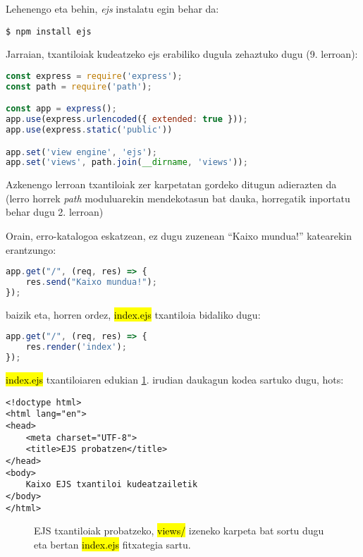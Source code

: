 Lehenengo eta behin, \textit{ejs} instalatu egin behar da:

\begin{lstlisting}[numbers=none]
$ npm install ejs 
\end{lstlisting}

Jarraian, txantiloiak kudeatzeko ejs erabiliko dugula zehaztuko dugu (9. lerroan):

\begin{lstlisting}[language=JavaScript,numbers=none]
const express = require('express');
const path = require('path');

const app = express();
app.use(express.urlencoded({ extended: true }));
app.use(express.static('public'))

app.set('view engine', 'ejs');
app.set('views', path.join(__dirname, 'views'));
\end{lstlisting}

Azkenengo lerroan txantiloiak zer karpetatan gordeko ditugun adierazten da (lerro horrek \textit{path} moduluarekin mendekotasun bat dauka, horregatik inportatu behar dugu 2. lerroan)

Orain, erro-katalogoa eskatzean, ez dugu zuzenean ``Kaixo mundua!'' katearekin erantzungo:

\begin{lstlisting}[language=JavaScript, numbers=none]
app.get("/", (req, res) => {
    res.send("Kaixo mundua!");
});
\end{lstlisting}

baizik eta, horren ordez, \hl{index.ejs} txantiloia bidaliko dugu:

\begin{lstlisting}[language=JavaScript, numbers=none]
app.get("/", (req, res) => {
    res.render('index');
});
\end{lstlisting}

\hl{index.ejs} txantiloiaren edukian \ref{fig:ejs}. irudian daukagun kodea sartuko dugu, hots:

\begin{lstlisting}[numbers=none]
<!doctype html>
<html lang="en">
<head>
    <meta charset="UTF-8">
    <title>EJS probatzen</title>
</head>
<body>
    Kaixo EJS txantiloi kudeatzailetik
</body>
</html>
\end{lstlisting}

\begin{figure}[ht]
	\centering
{}
\caption{EJS txantiloiak probatzeko, \hl{views/} izeneko karpeta bat sortu dugu eta bertan \hl{index.ejs} fitxategia sartu.}
\label{fig:ejs}
\end{figure}

